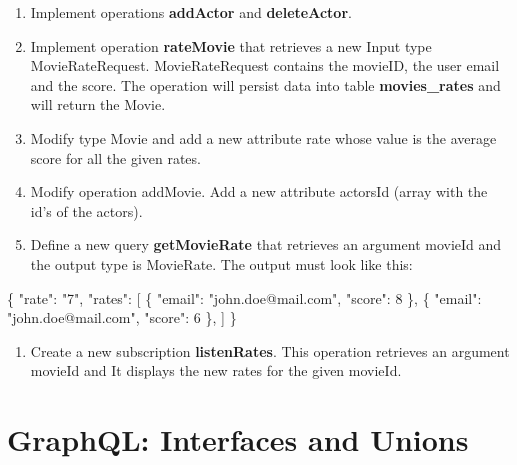 \documentclass[]{book}
\newenvironment{Shaded}{\begin{snugshade}}{\end{snugshade}}
\newcommand{\DataTypeTok}[1]{\textcolor[rgb]{0.13,0.29,0.53}{#1}}
\newcommand{\DecValTok}[1]{\textcolor[rgb]{0.00,0.00,0.81}{#1}}
\newcommand{\StringTok}[1]{\textcolor[rgb]{0.31,0.60,0.02}{#1}}
\newcommand{\OtherTok}[1]{\textcolor[rgb]{0.56,0.35,0.01}{#1}}
\newcommand{\FunctionTok}[1]{\textcolor[rgb]{0.00,0.00,0.00}{#1}}
\providecommand{\tightlist}{%
  \setlength{\itemsep}{0pt}\setlength{\parskip}{0pt}}
\begin{document}
\begin{enumerate}
\def\labelenumi{\arabic{enumi}.}
\tightlist
\item
  Implement operations \textbf{addActor} and \textbf{deleteActor}.
\item
  Implement operation \textbf{rateMovie} that retrieves a new Input type
  MovieRateRequest. MovieRateRequest contains the movieID, the user
  email and the score. The operation will persist data into table
  \textbf{movies\_rates} and will return the Movie.
\item
  Modify type Movie and add a new attribute rate whose value is the
  average score for all the given rates.
\item
  Modify operation addMovie. Add a new attribute actorsId (array with
  the id's of the actors).
\item
  Define a new query \textbf{getMovieRate} that retrieves an argument
  movieId and the output type is MovieRate. The output must look like
  this:
\end{enumerate}

\begin{Shaded}
\begin{Highlighting}[]
\FunctionTok{\{}
  \DataTypeTok{"rate"}\FunctionTok{:} \StringTok{"7"}\FunctionTok{,}
  \DataTypeTok{"rates"}\FunctionTok{:} \OtherTok{[}
    \FunctionTok{\{}
      \DataTypeTok{"email"}\FunctionTok{:} \StringTok{"john.doe@mail.com"}\FunctionTok{,}
      \DataTypeTok{"score"}\FunctionTok{:} \DecValTok{8}
    \FunctionTok{\}}\OtherTok{,}
    \FunctionTok{\{}
      \DataTypeTok{"email"}\FunctionTok{:} \StringTok{"john.doe@mail.com"}\FunctionTok{,}
      \DataTypeTok{"score"}\FunctionTok{:} \DecValTok{6}
    \FunctionTok{\}}\OtherTok{,}
  \OtherTok{]}
\FunctionTok{\}}
\end{Highlighting}
\end{Shaded}

\begin{enumerate}
\def\labelenumi{\arabic{enumi}.}
\setcounter{enumi}{4}
\tightlist
\item
  Create a new subscription \textbf{listenRates}. This operation
  retrieves an argument movieId and It displays the new rates for the
  given movieId.
\end{enumerate}

\chapter{GraphQL: Interfaces and
Unions}\label{graphql-interfaces-and-unions}
\end{document}
